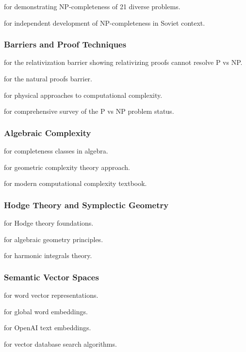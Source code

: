 \documentclass[11pt, letterpaper]{article}
\begin{document}
\cite{karp1972} for demonstrating NP-completeness of 21 diverse problems.

\cite{levin1973} for independent development of NP-completeness in Soviet context.

\subsubsection{Barriers and Proof Techniques}

\cite{baker1975} for the relativization barrier showing relativizing proofs cannot resolve P vs NP.

\cite{razborov1994} for the natural proofs barrier.

\cite{aaronson2005} for physical approaches to computational complexity.

\cite{fortnow2009} for comprehensive survey of the P vs NP problem status.

\subsubsection{Algebraic Complexity}

\cite{valiant1979} for completeness classes in algebra.

\cite{mulmuley2001} for geometric complexity theory approach.

\cite{arora-barak2009} for modern computational complexity textbook.

\subsubsection{Hodge Theory and Symplectic Geometry}

\cite{voisin2002} for Hodge theory foundations.

\cite{griffiths-harris1978} for algebraic geometry principles.

\cite{hodge1941} for harmonic integrals theory.

\subsubsection{Semantic Vector Spaces}

\cite{mikolov2013} for word vector representations.

\cite{pennington2014} for global word embeddings.

\cite{openai2022} for OpenAI text embeddings.

\cite{douze2017} for vector database search algorithms.
\end{document}
